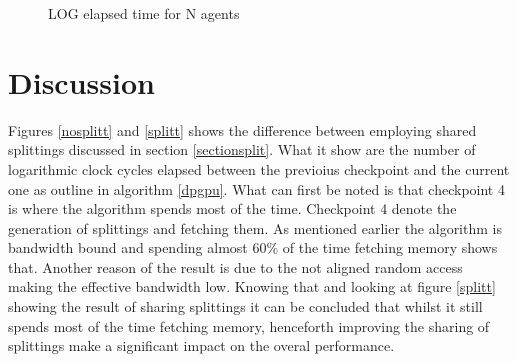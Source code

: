 \documentclass{aamas2012}
\begin{document}
\begin{figure}[width=\linewidth]
\caption{LOG elapsed time for N agents\label{time}}
\end{figure}
\section{Discussion} %
Figures \ref{nosplitt} and \ref{splitt} shows the difference between employing 
shared splittings discussed in section \ref{sectionsplit}. 
What it show are the number of logarithmic clock cycles elapsed between the 
previoius checkpoint and the current one as outline in algorithm \ref{dpgpu}.
What can first be noted is that checkpoint 4 is where the algorithm spends most of the time. 
Checkpoint 4 denote the generation of splittings and fetching them.
As mentioned earlier the algorithm is bandwidth bound and spending almost
$60\%$ of the time fetching memory shows that. Another reason of the result
is due to the not aligned random access making the effective bandwidth low.
Knowing that and looking at figure \ref{splitt} showing the result of sharing splittings it can be concluded that whilst it still spends most 
of the time fetching memory, henceforth improving the sharing of splittings make a significant impact on the overal performance.
\end{document}
